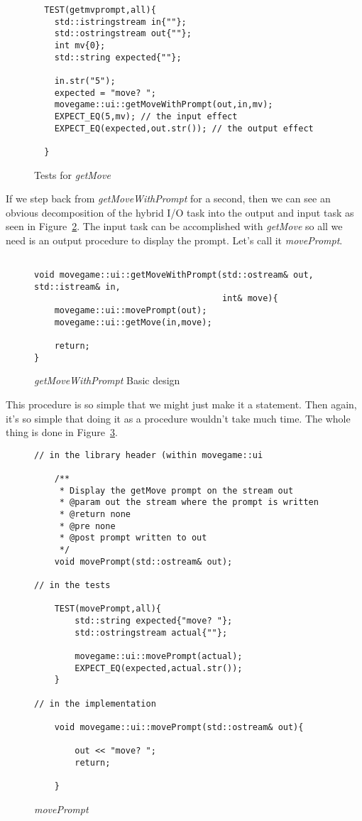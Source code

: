 \documentclass[nobib]{tufte-handout}
\begin{document}
\begin{figure}[!htbp]
\begin{lstlisting}
  TEST(getmvprompt,all){
    std::istringstream in{""};
    std::ostringstream out{""};
    int mv{0};
    std::string expected{""};

    in.str("5");
    expected = "move? ";
    movegame::ui::getMoveWithPrompt(out,in,mv);
    EXPECT_EQ(5,mv); // the input effect
    EXPECT_EQ(expected,out.str()); // the output effect

  }
\end{lstlisting}
\caption{Tests for \textit{getMove}}
\label{fig:getPrmt-tests}
\end{figure}

If we step back from \textit{getMoveWithPrompt} for a second, then we can see an obvious decomposition of the hybrid I/O task into the output and input task as seen in Figure~\ref{fig:getPrmt-basic}.  The input task can be accomplished with \textit{getMove} so all we need is an output procedure to display the prompt.  Let's call it \textit{movePrompt}.

\begin{figure}[!htbp]
\begin{lstlisting}

void movegame::ui::getMoveWithPrompt(std::ostream& out, std::istream& in,
								     int& move){
	movegame::ui::movePrompt(out);
	movegame::ui::getMove(in,move);

	return;
}
\end{lstlisting}
\caption{\textit{getMoveWithPrompt} Basic design}
\label{fig:getPrmt-basic}
\end{figure}


This procedure is so simple that we might just make it a statement. Then again, it's so simple that doing it as a procedure wouldn't take much time. The whole thing is done in Figure~\ref{fig:mvprmt}.

\begin{figure}[!htbp]
\begin{lstlisting}
// in the library header (within movegame::ui

    /**
     * Display the getMove prompt on the stream out
     * @param out the stream where the prompt is written
     * @return none
     * @pre none
     * @post prompt written to out
     */
    void movePrompt(std::ostream& out);

// in the tests

 	TEST(movePrompt,all){
    	std::string expected{"move? "};
    	std::ostringstream actual{""};

	    movegame::ui::movePrompt(actual);
  	    EXPECT_EQ(expected,actual.str());
  	}

// in the implementation

	void movegame::ui::movePrompt(std::ostream& out){

		out << "move? ";
		return;

	}

\end{lstlisting}
\caption{\textit{movePrompt}}
\label{fig:mvprmt}
\end{figure}
\end{document}
